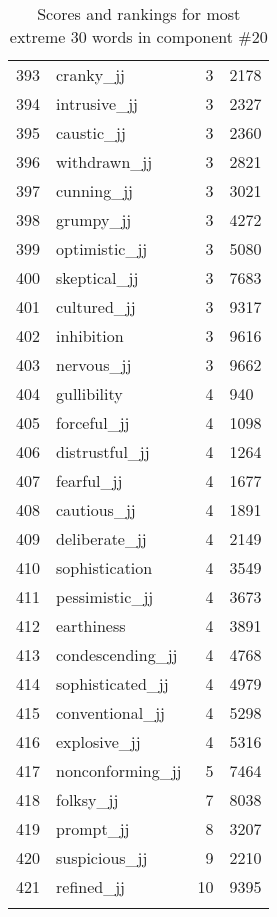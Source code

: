 \begin{longtable}[!htbp]{| rlr@{.}l |}
    393 & cranky\_jj & 3 & 2178 \\
    394 & intrusive\_jj & 3 & 2327 \\
    395 & caustic\_jj & 3 & 2360 \\
    396 & withdrawn\_jj & 3 & 2821 \\
    397 & cunning\_jj & 3 & 3021 \\
    398 & grumpy\_jj & 3 & 4272 \\
    399 & optimistic\_jj & 3 & 5080 \\
    400 & skeptical\_jj & 3 & 7683 \\
    401 & cultured\_jj & 3 & 9317 \\
    402 & inhibition & 3 & 9616 \\
    403 & nervous\_jj & 3 & 9662 \\
    404 & gullibility & 4 & 940 \\
    405 & forceful\_jj & 4 & 1098 \\
    406 & distrustful\_jj & 4 & 1264 \\
    407 & fearful\_jj & 4 & 1677 \\
    408 & cautious\_jj & 4 & 1891 \\
    409 & deliberate\_jj & 4 & 2149 \\
    410 & sophistication & 4 & 3549 \\
    411 & pessimistic\_jj & 4 & 3673 \\
    412 & earthiness & 4 & 3891 \\
    413 & condescending\_jj & 4 & 4768 \\
    414 & sophisticated\_jj & 4 & 4979 \\
    415 & conventional\_jj & 4 & 5298 \\
    416 & explosive\_jj & 4 & 5316 \\
    417 & nonconforming\_jj & 5 & 7464 \\
    418 & folksy\_jj & 7 & 8038 \\
    419 & prompt\_jj & 8 & 3207 \\
    420 & suspicious\_jj & 9 & 2210 \\
    421 & refined\_jj & 10 & 9395 \\
    \hline
    \caption{Scores and rankings for most extreme 30 words in component \#20} \\
\end{longtable}
